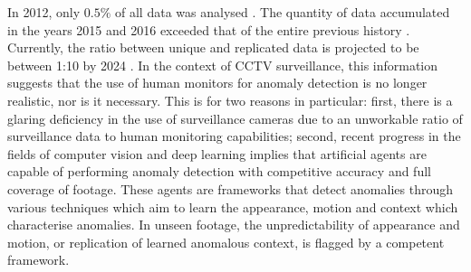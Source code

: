 \documentclass[sigplan,authorversion,nonacm, 9pt]{acmart}
\begin{document}
In 2012, only $0.5\%$ of all data was analysed \cite{iot}. The quantity of data accumulated in the years 2015 and 2016 exceeded that of the entire previous history \cite{iot}. Currently, the ratio between unique and replicated data is projected to be between 1:10 by 2024 \cite{iot}. In the context of CCTV surveillance, this information suggests that the use of human monitors for anomaly detection is no longer realistic, nor is it necessary. This is for two reasons in particular: first, there is a glaring deficiency in the use of surveillance cameras due to an unworkable ratio of surveillance data to human monitoring capabilities; second, recent progress in the fields of computer vision and deep learning implies that artificial agents are capable of performing anomaly detection with competitive accuracy and full coverage of footage. These agents are frameworks that detect anomalies through various techniques which aim to learn the appearance, motion and context which characterise anomalies. In unseen footage, the unpredictability of appearance and motion, or replication of learned anomalous context, is flagged by a competent framework. 
\par
\end{document}
